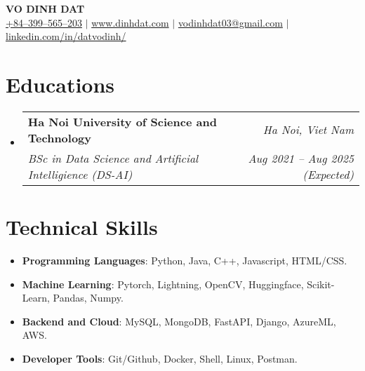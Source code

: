 \documentclass[letterpaper,11pt]{article}
\makeatletter
\newcommand{\resumeitem}[1]{
  \item\small{
    #1 \vspace{-2pt}
  }
}
\newcommand{\resumeSubheading}[4]{
  \vspace{-1pt}\item
    \begin{tabular*}{0.97\textwidth}[t]{l@{\extracolsep{\fill}}r}
      \textbf{#1} & \textit{#2} \\
      \textit{\small#3} & \textit{\small #4} \\
    \end{tabular*}\vspace{-6pt}
}
\newcommand{\resumeSubHeadingListStart}{\begin{itemize}[leftmargin=*,label={}]}
\newcommand{\resumeSubHeadingListEnd}{\end{itemize}}
\newcommand{\resumeItemListStart}{\begin{itemize}}
\newcommand{\resumeItemListEnd}{\end{itemize}\vspace{-5pt}}
\makeatother
\begin{document}

\begin{center}
  \textbf{\LARGE {VO DINH DAT}} \\ \vspace{1pt}
  \href{tel:+84399565203}{{+84--399--565--203}} $|$ \href{https://dinhdat.com}{{www.dinhdat.com}}
  $|$ \href{mailto:vodinhdat03@gmail.com}{{vodinhdat03@gmail.com}} $|$ 
  \href{https://www.linkedin.com/in/datvodinh/}{{linkedin.com/in/datvodinh/}}
  
\end{center}

\section{Educations}
  \resumeSubHeadingListStart
    \resumeSubheading
      {Ha Noi University of Science and Technology}{\textit{Ha Noi, Viet Nam}}
      {BSc in Data Science and Artificial Intelligience (DS-AI)}{Aug 2021 -- Aug 2025 (Expected)}
  \resumeSubHeadingListEnd

  
\section{Technical Skills}
\resumeItemListStart[leftmargin=*,label={}]
  \resumeitem{\textbf{Programming Languages}: {Python, Java, C++, Javascript, HTML/CSS.}} \\[-\baselineskip]
  \resumeitem{\textbf{Machine Learning}: {Pytorch, Lightning, OpenCV, Huggingface, Scikit-Learn, Pandas, Numpy.}} \\[-\baselineskip]
  \resumeitem{\textbf{Backend and Cloud}: {MySQL, MongoDB, FastAPI, Django, AzureML, AWS.}} \\[-\baselineskip]
  \resumeitem{\textbf{Developer Tools}: {Git/Github, Docker, Shell, Linux, Postman.}}\\[-\baselineskip]
\resumeItemListEnd
\end{document}
